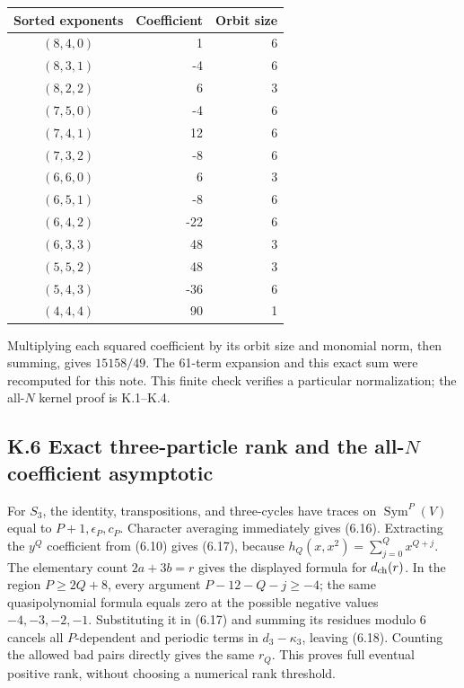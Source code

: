 \begin{longtable}[]{@{}crr@{}}
\toprule\noalign{}
Sorted exponents & Coefficient & Orbit size \\
\midrule\noalign{}
\endhead
\bottomrule\noalign{}
\endlastfoot
\((8,4,0)\) & 1 & 6 \\
\((8,3,1)\) & -4 & 6 \\
\((8,2,2)\) & 6 & 3 \\
\((7,5,0)\) & -4 & 6 \\
\((7,4,1)\) & 12 & 6 \\
\((7,3,2)\) & -8 & 6 \\
\((6,6,0)\) & 6 & 3 \\
\((6,5,1)\) & -8 & 6 \\
\((6,4,2)\) & -22 & 6 \\
\((6,3,3)\) & 48 & 3 \\
\((5,5,2)\) & 48 & 3 \\
\((5,4,3)\) & -36 & 6 \\
\((4,4,4)\) & 90 & 1 \\
\end{longtable}

Multiplying each squared coefficient by its orbit size and monomial norm, then summing, gives \(15158/49\). The 61-term expansion and this exact sum were recomputed for this note. This finite check verifies a particular normalization; the all-\(N\) kernel proof is K.1--K.4.

\hypertarget{k.6-exact-three-particle-rank-and-the-all-n-coefficient-asymptotic}{%
\subsection{\texorpdfstring{K.6 Exact three-particle rank and the all-\(N\) coefficient asymptotic}{K.6 Exact three-particle rank and the all-N coefficient asymptotic}}\label{k.6-exact-three-particle-rank-and-the-all-n-coefficient-asymptotic}}

For \(S_3\), the identity, transpositions, and three-cycles have traces on \(\operatorname{Sym}^P(V)\) equal to \(P+1,\epsilon_P,c_P\). Character averaging immediately gives (6.16). Extracting the \(y^Q\) coefficient from (6.10) gives (6.17), because \(h_Q(x,x^2)=\sum_{j=0}^Qx^{Q+j}\). The elementary count \(2a+3b=r\) gives the displayed formula for \(d_{\rm ch}(r)\). In the region \(P\ge2Q+8\), every argument \(P-12-Q-j\ge-4\); the same quasipolynomial formula equals zero at the possible negative values \(-4,-3,-2,-1\). Substituting it in (6.17) and summing its residues modulo 6 cancels all \(P\)-dependent and periodic terms in \(d_3-\kappa_3\), leaving (6.18). Counting the allowed bad pairs directly gives the same \(r_Q\). This proves full eventual positive rank, without choosing a numerical rank threshold.

